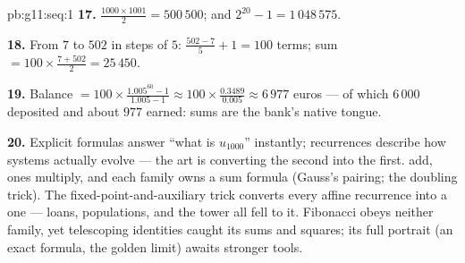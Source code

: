\begin{solution}{pb:g11:seq:1}
\textbf{17.} $\frac{1000 \times 1001}{2} = 500\,500$; and
$2^{20} - 1 = 1\,048\,575$.

\textbf{18.} From $7$ to $502$ in steps of $5$:
$\frac{502 - 7}{5} + 1 = 100$ terms; sum
$= 100 \times \frac{7 + 502}{2} = 25\,450$.

\textbf{19.} Balance $= 100 \times \frac{1.005^{60} - 1}
{1.005 - 1} \approx 100 \times \frac{0.3489}{0.005} \approx
6\,977$ euros --- of which $6\,000$ deposited and about $977$
earned:  sums are the bank's native tongue.

\textbf{20.} Explicit formulas answer ``what is $u_{1000}$''
instantly; recurrences describe how systems actually evolve ---
the art is converting the second into the first.  add,  ones multiply, and each family owns a
sum formula (Gauss's pairing; the doubling trick). The
fixed-point-and-auxiliary trick converts every affine
recurrence into a  one --- loans, populations, and
the tower all fell to it. Fibonacci obeys neither family, yet
telescoping identities caught its sums and squares; its full
portrait (an exact formula, the golden limit) awaits stronger
tools.
\end{solution}
